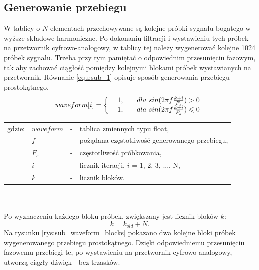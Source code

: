 \subsection{Generowanie przebiegu}
W tablicy o $N$ elementach przechowywane są kolejne próbki sygnału bogatego w wyższe składowe harmoniczne. Po dokonaniu filtracji i wystawieniu tych próbek na przetwornik cyfrowo-analogowy, w tablicy tej należy wygenerować kolejne 1024 próbek sygnału. Trzeba przy tym pamiętać o odpowiednim przesunięciu fazowym, tak aby zachować ciągłość pomiędzy kolejnymi blokami próbek wystawianych na przetwornik. Równanie \ref{equ:sub_1} opisuje sposób generowania przebiegu prostokątnego.
\begin{equation} \label{equ:sub_1}
waveform[i]=\left \{\begin{array}{ r l }
1, & \quad \text{$dla$ } sin(2\pi f\frac{k+i}{F_s}) > 0\\
-1, & \quad  \text{$dla$ } sin(2\pi f\frac{k+i}{F_s}) \leqslant 0
\end{array}
\right.
\end{equation}
\begin{tabular}{ l l l l}
	gdzie: & $waveform$ &  - & tablica zmiennych typu float, \\
	&	$f$ & - &  pożądana częstotliwość generowanego przebiegu, \\
	&	$F_s$ & - & częstotliwość próbkowania,\\
	&	$i$ & - &  licznik iteracji, $i$ = 1, 2, 3, ..., N,\\
	&	$k$ & - &  licznik bloków.\\
\end{tabular} \\ \\
Po wyznaczeniu każdego bloku próbek, zwiększany jest licznik bloków $k$:
\begin{equation} \label{equ:sub_2}
k = k_{old} + N.
\end{equation}
Na rysunku \ref{rys:sub_waveform_blocks} pokazano dwa kolejne bloki próbek wygenerowanego przebiegu prostokątnego. Dzięki odpowiedniemu przesunięciu fazowemu przebiegi te, po wystawieniu na przetwornik cyfrowo-analogowy, utworzą ciągły dźwięk - bez trzasków.
